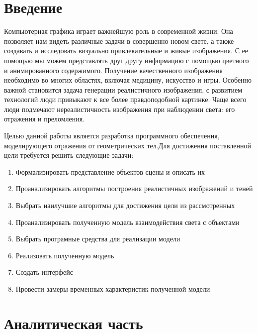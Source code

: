 \documentclass[a4paper,14pt,unknownkeysallowed]{extreport}
\begin{document}
\setcounter{page}{2}
\chapter{Введение}

Компьютерная графика играет важнейшую роль в современной жизни. 
Она позволяет нам видеть различные задачи в совершенно новом свете, а также создавать и исследовать визуально привлекательные и живые изображения.
С ее помощью мы можем представлять друг другу информацию с помощью цветного и анимированного содержимого. 
Получение качественного изображения необходимо во многих областях, включая медицину, искусство и игры.
Особенно важной становится задача генерации реалистичного изображения, с развитием технологий люди привыкают к все более
правдоподобной картинке. Чаще всего люди подмечают нереалистичность изображения при наблюдении света: его отражения и преломления.


Целью данной работы является разработка программного обеспечения, моделирующего отражения от геометрических тел.Для достижения поставленной цели требуется
решить следующие задачи:
\begin{enumerate}
	\item Формализировать представление объектов сцены и описать их
	\item Проанализировать алгоритмы построения реалистичных изображений и теней
	\item Выбрать наилучшие алгоритмы для достижения цели  из рассмотренных
	\item Проанализировать полученную  модель взаимодействия света с объектами
	\item Выбрать програмные средства для реализации модели
	\item Реализовать полученную модель
	\item Создать интерфейс
	\item Провести замеры временных характеристик полученной модели
\end{enumerate}





\chapter{Аналитическая часть}
\end{document}
